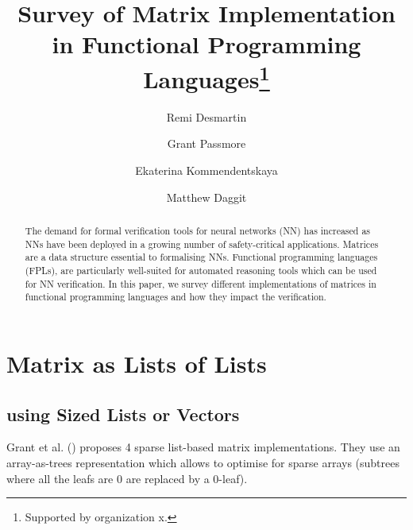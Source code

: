\documentclass[runningheads]{llncs}
\begin{document}
%
\title{Survey of Matrix Implementation in Functional Programming Languages\thanks{Supported by organization x.}}
%
%
\author{Remi Desmartin \and
Grant Passmore\and
Ekaterina Kommendentskaya\and
Matthew Daggit}
%
%
%
\maketitle              %
%
\begin{abstract}
The demand for formal verification tools for neural networks (NN) has increased as NNs have been deployed in a growing number of safety-critical applications. Matrices are a data structure essential to formalising NNs. Functional programming languages (FPLs), are particularly well-suited for automated reasoning tools which can be used for NN verification.
In this paper, we survey different implementations of matrices in functional programming languages and how they impact the verification.

\end{abstract}
%
%
%
\section{Matrix as Lists of Lists}
\subsection{using Sized Lists or Vectors}

Grant et al. (\cite{grant_sparse_1996}) proposes 4 sparse list-based matrix implementations. They use an array-as-trees representation which allows to optimise for sparse arrays (subtrees where all the leafs are 0 are replaced by a 0-leaf).
\end{document}
